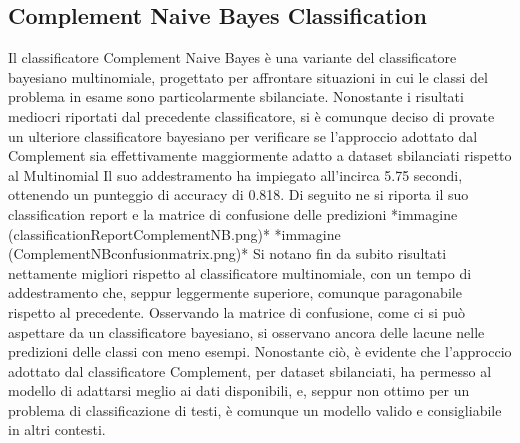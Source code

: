 \documentclass[12pt,oneside]{article}
\begin{document}
     \begin{enumerate}
    \subsection{Complement Naive Bayes Classification}
    \begin{justify}
        Il classificatore Complement Naive Bayes è una variante del classificatore bayesiano multinomiale, progettato per affrontare situazioni in cui le classi del problema in esame sono particolarmente sbilanciate. Nonostante i risultati mediocri riportati dal precedente classificatore, si è comunque deciso di provate un ulteriore classificatore bayesiano per verificare se l’approccio adottato dal Complement sia effettivamente maggiormente adatto a dataset sbilanciati rispetto al Multinomial
    Il suo addestramento ha impiegato all’incirca 5.75 secondi, ottenendo un punteggio di accuracy di 0.818. Di seguito ne si riporta il suo classification report e la matrice di confusione delle predizioni
    *immagine (classificationReportComplementNB.png)*
    *immagine (ComplementNBconfusionmatrix.png)*
    Si notano fin da subito risultati nettamente migliori rispetto al classificatore multinomiale, con un tempo di addestramento che, seppur leggermente superiore, comunque paragonabile rispetto al precedente. Osservando la matrice di confusione, come ci si può aspettare da un classificatore bayesiano, si osservano ancora delle lacune nelle predizioni delle classi con meno esempi. Nonostante ciò, è evidente che l’approccio adottato dal classificatore Complement, per dataset sbilanciati, ha permesso al modello di adattarsi meglio ai dati disponibili, e, seppur non ottimo per un problema di classificazione di testi, è comunque un modello valido e consigliabile in altri contesti.
    \end{justify}
    \end{enumerate}
    
\end{document}
